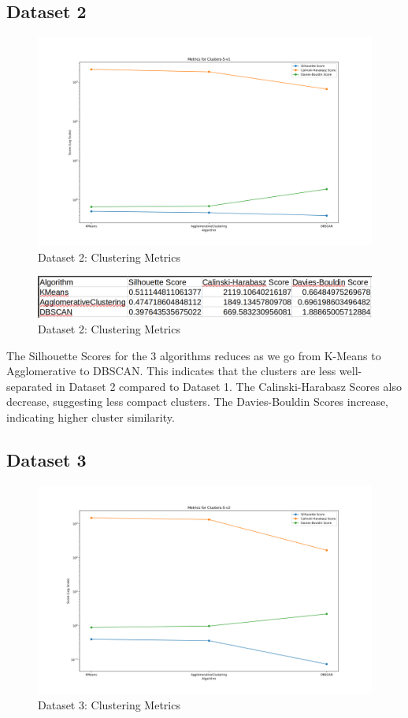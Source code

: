 \subsection*{Dataset 2}

\begin{figure}[H]
	\centering
	\includegraphics[width=0.8\linewidth]{Metrics/Clusters-5-v1-metrics.png}
	\caption{Dataset 2: Clustering Metrics}
	\label{fig:clusters-5-v1-metrics}
\end{figure}

\begin{figure}[H]
	\centering
	\includegraphics[width=0.9\linewidth]{Metrics/dataset-2.png}
	\caption{Dataset 2: Clustering Metrics}
	\label{fig:dataset-2}
\end{figure}

The Silhouette Scores for the 3 algorithms reduces as we go from K-Means to Agglomerative to DBSCAN. This indicates that the clusters are less well-separated in Dataset 2 compared to Dataset 1. The Calinski-Harabasz Scores also decrease, suggesting less compact clusters. The Davies-Bouldin Scores increase, indicating higher cluster similarity.

\subsection*{Dataset 3}

\begin{figure}[H]
	\centering
	\includegraphics[width=0.8\linewidth]{Metrics/Clusters-5-v2-metrics.png}
	\caption{Dataset 3: Clustering Metrics}
	\label{fig:clusters-5-v2-metrics}
\end{figure}

